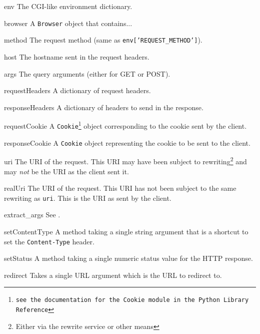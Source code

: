 \documentclass{manual}
\begin{document}
\begin{argdesc}
\item[env] The CGI-like environment dictionary.
\item[browser] A \texttt{Browser} object that contains... %
\item[method] The request method (same as \texttt{env['REQUEST_METHOD']}).
\item[host] The hostname sent in the request headers.
\item[args] The query arguments (either for GET or POST).
\item[requestHeaders] A dictionary of request headers.
\item[responseHeaders] A dictionary of headers to send in the response.
\item[requestCookie] A \texttt{Cookie\footnote{see the documentation
for the \texttt{Cookie} module in the Python Library Reference}}
object corresponding to the cookie sent by the client.
\item[responseCookie] A \texttt{Cookie} object representing the cookie
to be sent to the client.
\item[uri] The URI of the request.  This URI may have been subject to
rewriting\footnote{Either via the rewrite service or other means} and
may \emph{not} be the URI as the client sent it.
\item[realUri] The URI of the request.  This URI has not been subject
to the same rewriting as \texttt{uri}.  This is the URI as sent by the
client.
\item[extract_args] See .
\item[setContentType] A method taking a single string argument that is
a shortcut to set the \texttt{Content-Type} header.
\item[setStatus] A method taking a single numeric status value for the
HTTP response.
\item[redirect] Takes a single URL argument which is the URL to
redirect to.
\end{argdesc}



\cleardoublepage

\printindex
\end{document}
